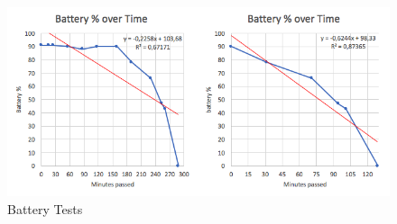 \begin{figure}[h!]
    \centering
    \includegraphics[width=1\textwidth]{figures/batteryTest.png}
    \caption{Battery Tests}
    \label{battery_test}
\end{figure}